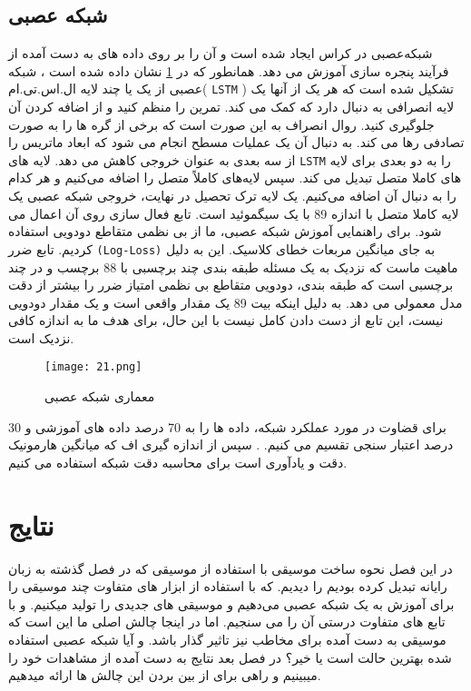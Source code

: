\subsection{شبکه عصبی} 
شبکه‌عصبی در کراس ایجاد شده است و آن را بر روی داده های به دست آمده از فرآیند پنجره سازی آموزش می دهد.  همانطور که در
\cref{fig.15}
نشان داده شده است
، شبکه عصبی از یک یا چند لایه ال.اس.تی.ام(
\verb;LSTM; 
)
تشکیل شده است که هر یک از آنها یک لایه انصرافی به دنبال دارد که کمک می کند.
تمرین را منظم کنید و از اضافه کردن آن جلوگیری کنید. روال انصراف به این صورت است که برخی از گره ها را به صورت تصادفی رها می کند. 
به دنبال آن یک عملیات مسطح انجام می شود که ابعاد ماتریس را از سه بعدی به عنوان خروجی کاهش می دهد.
لایه های 
\verb;LSTM;
را به دو بعدی برای لایه های کاملا متصل تبدیل می کند.  سپس لایه‌های کاملاً متصل را اضافه می‌کنیم و هر کدام را به دنبال آن اضافه می‌کنیم. 
یک لایه ترک تحصیل در نهایت، خروجی شبکه عصبی یک لایه کاملا متصل با اندازه 89 با یک سیگموئید
است.
تابع فعال سازی روی آن اعمال می شود. برای راهنمایی آموزش شبکه عصبی، ما از بی نظمی
متقاطع دودویی استفاده کردیم.
تابع ضرر 
\verb;(Log-Loss);
به جای میانگین مربعات خطای کلاسیک. این به دلیل ماهیت ماست
که نزدیک به یک مسئله طبقه بندی چند برچسبی با 88 برچسب و در چند برچسبی است
که طبقه بندی، دودویی متقاطع بی نظمی امتیاز ضرر را بیشتر از دقت مدل معمولی می دهد. 
 به دلیل اینکه بیت 89 یک مقدار واقعی است و یک مقدار دودویی نیست، این تابع از دست دادن
کامل نیست با این حال، برای هدف ما به اندازه کافی نزدیک است. 
\begin{figure}[!h]
\texttt{[image: 21.png]}
\caption{معماری شبکه عصبی}\label{fig.15}
\end{figure}

برای قضاوت در مورد عملکرد شبکه، داده ها را به 70 درصد داده های آموزشی و 30 درصد اعتبار سنجی تقسیم می کنیم.
. سپس از اندازه گیری اف
که میانگین هارمونیک دقت و یادآوری است برای محاسبه دقت شبکه استفاده می کنیم.
\section{نتایج}
در این فصل نحوه ساخت موسیقی با استفاده از موسیقی که در فصل گذشته به زبان رایانه تبدیل کرده بودیم را دیدیم.
که با استفاده از ابزار های متفاوت چند موسیقی را برای آموزش به یک شبکه عصبی می‌دهیم و موسیقی های جدیدی را تولید میکنیم. و با تابع های متفاوت درستی آن را می سنجیم. اما در اینجا چالش اصلی ما این است که موسیقی به دست آمده برای مخاطب نیز تاثیر گذار باشد. و آیا شبکه عصبی استفاده شده بهترین حالت است یا خیر؟ 
در فصل بعد نتایج به دست آمده از مشاهدات خود را میبینیم و راهی برای از بین بردن این چالش ها ارائه میدهیم. 
\cite{hewahi2019generation}